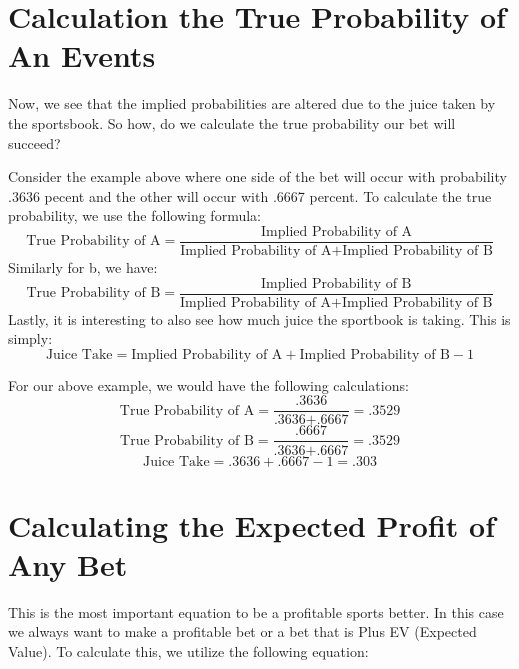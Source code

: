 \documentclass{article}
\begin{document}
\section{Calculation the True Probability of An Events}
Now, we see that the implied probabilities are altered due to the juice taken by the sportsbook. So how, do we calculate the true probability our bet will succeed? 

Consider the example above where one side of the bet will occur with probability .3636 pecent and the other will occur with .6667 percent. To calculate the true probability, we use the following formula:
\begin{equation}
  \textrm{True Probability of A} = \frac{\textrm{Implied Probability of A}}{\textrm{Implied Probability of A} + \textrm{Implied Probability of B}}
\end{equation}
Similarly for b, we have:
\begin{equation}
  \textrm{True Probability of B} = \frac{\textrm{Implied Probability of B}}{\textrm{Implied Probability of A} + \textrm{Implied Probability of B}}
\end{equation}
Lastly, it is interesting to also see how much juice the sportbook is taking. This is simply:
\begin{equation}
  \textrm{Juice Take} = \textrm{Implied Probability of A} + \textrm{Implied Probability of B} - 1
\end{equation}

For our above example, we would have the following calculations:
\begin{equation}
  \textrm{True Probability of A} = \frac{\textrm{.3636}}{\textrm{.3636} + \textrm{.6667}} = .3529
\end{equation}
\begin{equation}
  \textrm{True Probability of B} = \frac{\textrm{.6667}}{\textrm{.3636} + \textrm{.6667}} = .3529
\end{equation}
\begin{equation}
  \textrm{Juice Take} = \textrm{.3636} + \textrm{.6667} - 1 = .303
\end{equation}

\section{Calculating the Expected Profit of Any Bet}
This is the most important equation to be a profitable sports better. In this case we always want to make a profitable bet or a bet that is Plus EV (Expected Value). To calculate this, we utilize the following equation:
\end{document}

